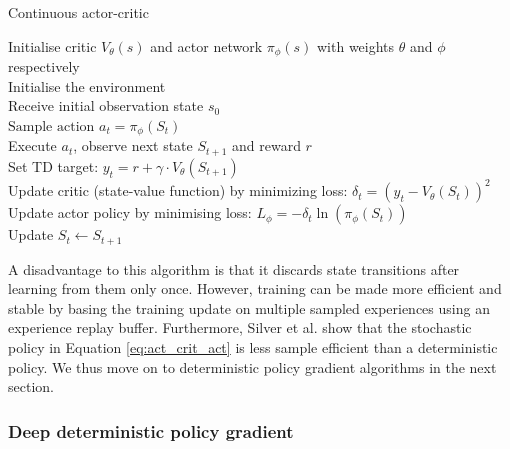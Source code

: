 \begin{algorithm}[hbt!]
\caption{Continuous actor-critic}\label{alg:cont_act_crit}
Initialise critic $V_{\theta}(s)$ and actor network $\pi_{\phi}(s)$ with weights $\theta$ and $\phi$ respectively\\
Initialise the environment\\
{
    Receive initial observation state $s_0$\\
    {
        $\text{Sample action } a_t = \pi_{\phi}(S_t)$ \\
        Execute $a_t$, observe next state $S_{t+1}$ and reward $r$    \\
        Set TD target: $y_t = r + \gamma \cdot V_{\theta}(S_{t+1})$ \\
        Update critic (state-value function) by minimizing loss: $\delta_t = (y_t - V_{\theta}(S_t))^2$ \\
        Update actor policy by minimising loss: \hspace{5cm}
        $L_\phi = -\delta_t \ln(\pi_{\phi}(S_t))$ \\
        Update $S_t \leftarrow S_{t+1}$\\
    }
}
\end{algorithm}

A disadvantage to this algorithm is that it discards state transitions after learning from them only once.
However, training can be made more efficient and stable by basing the training update on multiple sampled experiences using an experience replay buffer.
Furthermore, Silver et al. \cite{silver2014} show that the stochastic policy in Equation \ref{eq:act_crit_act} is less sample efficient than a deterministic policy. We thus move on to deterministic policy gradient algorithms in the next section. 

\subsubsection{Deep deterministic policy gradient}

